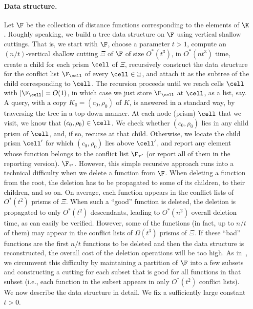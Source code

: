 \paragraph{Data structure.}
\fi
Let $\F$ be the collection of distance functions corresponding to the elements of $\K$.
Roughly speaking, we build a tree data structure on $\F$ using vertical shallow cuttings. 
That is, we start with $\F$, choose a parameter $t>1$, compute an $(n/t)$-vertical shallow 
cutting $\Xi$ of $\F$ of size $O^*(t^3)$, in $O^*(nt^3)$ time, 
create a child for each prism 
$\cell$ of $\Xi$, recursively construct the data structure for the conflict list 
$\F_\cell$ of every $\cell\in\Xi$, and attach it as the subtree of the child corresponding 
to $\cell$. The recursion proceeds until we reach cells $\cell$ with $|\F_\cell| = O(1)$,
in which case we just store $\F_\cell$ at $\cell$, as a list, say.
%
A query, with a copy $K_0 = (c_0,\rho_0)$ of $K$, is answered in a standard way, by
traversing the tree in a top-down manner. At each node (prism) $\cell$ that we visit,
we know that $(c_0,\rho_0)\in\cell$. We check whether $(c_0,\rho_0)$ lies in any
child prism of $\cell$, and, if so, recurse at that child. Otherwise, we locate the
child prism $\cell'$ for which $(c_0,\rho_0)$ lies above $\cell'$, and report any
element whose function belongs to the conflict list 
\iffullver
$\F_{\tau'}$ (or report all of them
in the reporting version).
\else
$\F_{\tau'}$.
\fi
%
However, this simple recursive approach runs into a technical difficulty
when we delete a function from $\F$.
When deleting a function from the root, the deletion has to be propagated to some of 
its children, to their children, and so on. On average, each function appears in 
the conflict lists of $O^*(t^2)$ prisms of $\Xi$. When such a ``good'' function is deleted, 
the deletion is propagated to only $O^*(t^2)$ descendants, leading to $O^*(n^2)$ overall deletion 
time, as can easily be verified. However, some of the functions (in fact, up to $n/t$ of them) may appear 
in the conflict lists of $\Omega(t^3)$ prisms of $\Xi$.
If these ``bad'' functions are the first $n/t$ functions to be deleted and then the data structure 
is reconstructed, the overall cost of the deletion operations will be too high. 
As in~\cite{AM95,KMRSS}, we circumvent this difficulty by maintaining a partition of $\F$ into a few 
subsets and constructing a cutting for each subset that is good for all functions in that subset 
(i.e., each function in the subset appears in only $O^*(t^2)$ conflict lists). 
%
We now describe the data structure in detail. We fix a sufficiently large constant $t>0$.
